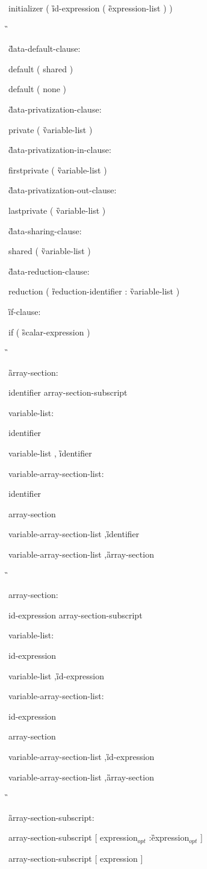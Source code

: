 {\I initializer \C ( \G id-expression \C ( \G expression-list \C ) ) 

\G\cppspecificend

\G data-default-clause:

\C\I default ( shared )

\I default ( none )

\G data-privatization-clause:

\C\I private ( \G variable-list \C )

\G data-privatization-in-clause:

\C\I firstprivate ( \G variable-list \C )

\G data-privatization-out-clause:

\C\I lastprivate ( \G variable-list \C )

\G data-sharing-clause:

\C\I shared ( \G variable-list \C )

\G data-reduction-clause:

\C\I reduction ( \G reduction-identifier \C : \G variable-list \C )

\G if-clause:

\C\I if ( \G scalar-expression \C )

\G\cspecificstart

\G array-section:

\I identifier array-section-subscript

variable-list:

\I identifier

\I variable-list \C, \G identifier

variable-array-section-list:

\I identifier

\I array-section

\I variable-array-section-list \C ,\G identifier

\I variable-array-section-list \C ,\G array-section

\G\cspecificend

\cppspecificstart

\I array-section:

\I id-expression array-section-subscript

variable-list:

\I id-expression

\I variable-list \C ,\G id-expression

variable-array-section-list:

\I id-expression

\I array-section

\I variable-array-section-list \C ,\G id-expression

\I variable-array-section-list \C ,\G array-section

\G\cppspecificend

\G array-section-subscript:

\I array-section-subscript [ expression$_{opt}$ \C :\G expression$_{opt}$ ]

\I array-section-subscript [ expression ]


\I [ expression ]

} %



